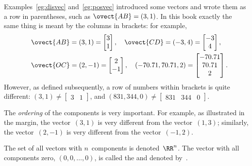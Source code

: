 Examples~\ref{eg:disvec} and~\ref{eg:posvec} introduced some vectors and wrote them as a row in parentheses, such as \(\ovect{AB}=(3,1)\).
In this book exactly the same thing is meant by the columns in brackets: for example,
\begin{eqnarray*}&&
\ovect{AB}=(3,1)=\begin{bmatrix} 3\\1 \end{bmatrix},\quad
\ovect{CD}=(-3,4)=\begin{bmatrix} -3\\4 \end{bmatrix},\quad
\\&&
\ovect{OC}=(2,-1)=\begin{bmatrix} 2\\-1 \end{bmatrix},\quad
(-70.71,70.71,2)=\begin{bmatrix} -70.71\\70.71\\2 \end{bmatrix}.
\end{eqnarray*}
However, as defined subsequently, a row of numbers within brackets is  quite different: \((3,1)\neq\begin{bmatrix} 3&1 \end{bmatrix}\),  and \((831,344,0)\neq\begin{bmatrix} 831&344&0 \end{bmatrix}\).

The \emph{ordering} of the components is very important.
%
For example, as illustrated in the margin, the vector~\((3,1)\) is very different from the vector~\((1,3)\); similarly, the vector~\((2,-1)\) is very different from the vector~\((-1,2)\).
 


\begin{definition} \label{def:rRn}
The set of all vectors with \(n\)~components is denoted~\(\RR^n\).
The vector with all components zero,  \((0,0,\ldots,0)\), is called the  and denoted by~\ov.
\end{definition}

